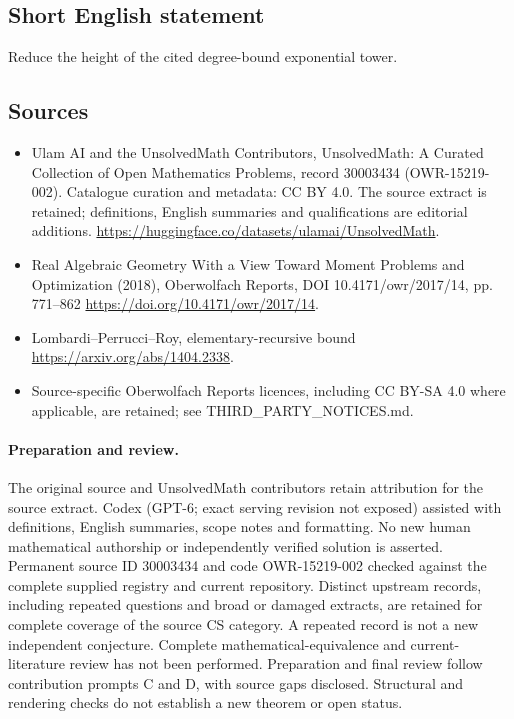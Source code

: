 \documentclass[11pt]{article}
\begin{document}
\subsection{Short English statement}
Reduce the height of the cited degree-bound exponential tower.
\subsection{Sources}
\begin{itemize}
\item[\hypertarget{source:30003434:1}{S1}] Ulam AI and the UnsolvedMath Contributors, UnsolvedMath: A Curated Collection of Open Mathematics Problems, record 30003434 (OWR-15219-002). Catalogue curation and metadata: CC BY 4.0. The source extract is retained; definitions, English summaries and qualifications are editorial additions.
\url{https://huggingface.co/datasets/ulamai/UnsolvedMath}.
\item[\hypertarget{source:30003434:2}{S2}] Real Algebraic Geometry With a View Toward Moment Problems and Optimization (2018), Oberwolfach Reports, DOI 10.4171/owr/2017/14, pp. 771--862
\url{https://doi.org/10.4171/owr/2017/14}.
\item[\hypertarget{source:30003434:3}{S3}] Lombardi--Perrucci--Roy, elementary-recursive bound
\url{https://arxiv.org/abs/1404.2338}.
\item Source-specific Oberwolfach Reports licences, including CC BY-SA 4.0 where applicable, are retained; see THIRD\_PARTY\_NOTICES.md.
\end{itemize}
\paragraph{Preparation and review.}
The original source and UnsolvedMath contributors retain attribution for the source extract. Codex (GPT-6; exact serving revision not exposed) assisted with definitions, English summaries, scope notes and formatting. No new human mathematical authorship or independently verified solution is asserted. Permanent source ID 30003434 and code OWR-15219-002 checked against the complete supplied registry and current repository. Distinct upstream records, including repeated questions and broad or damaged extracts, are retained for complete coverage of the source CS category. A repeated record is not a new independent conjecture. Complete mathematical-equivalence and current-literature review has not been performed. Preparation and final review follow contribution prompts C and D, with source gaps disclosed. Structural and rendering checks do not establish a new theorem or open status.
\label{end:30003434}
\end{document}

